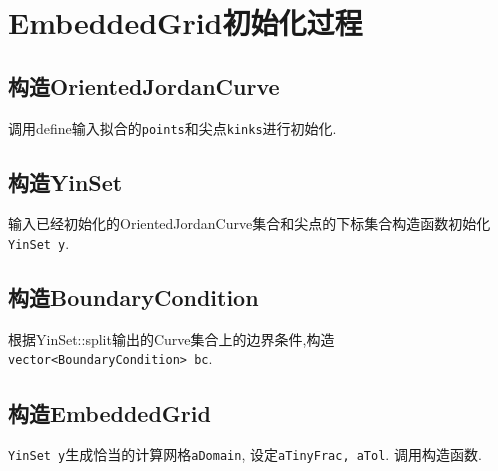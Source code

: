 \documentclass[a4paper]{book}
\numberwithin{equation}{chapter}
\theoremstyle{definition}
\begin{document}
\section{EmbeddedGrid初始化过程}
\subsection{构造OrientedJordanCurve}
调用define输入拟合的\texttt{points}和尖点\texttt{kinks}进行初始化.

\subsection{构造YinSet}
输入已经初始化的OrientedJordanCurve集合和尖点的下标集合构造函数初始化\texttt{YinSet y}.

\subsection{构造BoundaryCondition}
根据YinSet::split输出的Curve集合上的边界条件,构造\texttt{vector<BoundaryCondition> bc}.

\subsection{构造EmbeddedGrid}
\texttt{YinSet y}生成恰当的计算网格\texttt{aDomain}, 设定\texttt{aTinyFrac, aTol}. 调用构造函数.
\end{document}
